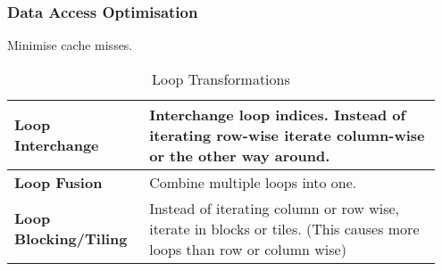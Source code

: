 		\subsubsection{Data Access Optimisation }		
			Minimise cache misses.
			
			\begin{table}[H]
				\centering
				\begin{tabular}{|p{0.3\linewidth}|p{0.65\linewidth}|}
					\hline
					\textbf{Loop Interchange}
						& Interchange loop indices. Instead of iterating row-wise iterate column-wise or the other way around.\\
					\hline
					\textbf{Loop Fusion}
						& Combine multiple loops into one. \\
					\hline
					\textbf{Loop Blocking/Tiling}
						& Instead of iterating column or row wise, iterate in blocks or tiles. (This causes more loops than row or column wise)\\
				\end{tabular}
				\caption{Loop Transformations}
			\end{table}
			
